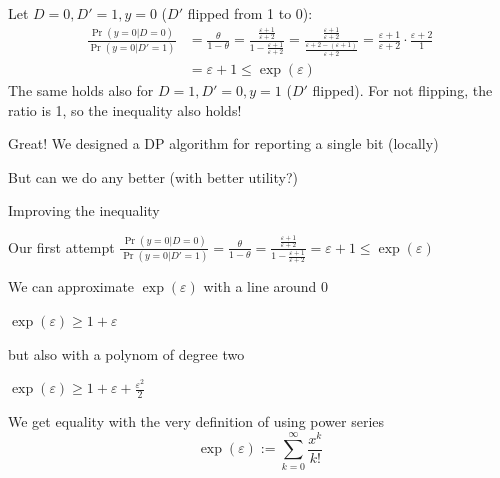 \documentclass[12pt,aspectratio=169,handout]{beamer}
\begin{document}
\begin{frame}

Let $D = 0, D' = 1, y = 0$ ($D'$ flipped from 1 to 0):
$$
\begin{aligned}
\frac{\Pr(y = 0 | D = 0)}{\Pr(y = 0 | D' = 1)} &=
\frac{\theta}{1 - \theta}
=
\frac{
\frac{\varepsilon + 1}{\varepsilon + 2}
}{
	1 - \frac{\varepsilon + 1}{\varepsilon + 2}
}
=
\frac{
\frac{\varepsilon + 1}{\varepsilon + 2}
}{
\frac{\varepsilon + 2 - (\varepsilon + 1)}{\varepsilon + 2}
}
=
\frac{\varepsilon + 1}{\varepsilon + 2}
\cdot
\frac{\varepsilon + 2}{1}
\\
&=
\varepsilon + 1
\leq \exp(\varepsilon)
\end{aligned}
$$
The same holds also for $D = 1, D' = 0, y = 1$ ($D'$ flipped). For not flipping, the ratio is 1, so the inequality also holds!

Great! We designed a DP algorithm for reporting a single bit (locally)

But can we do any better (with better utility?)

\end{frame}





\begin{frame}{Improving the inequality}

\begin{block}{Our first attempt}
$\frac{\Pr(y = 0 | D = 0)}{\Pr(y = 0 | D' = 1)} =
\frac{\theta}{1 - \theta} =
\frac{
\frac{\varepsilon + 1}{\varepsilon + 2}
}{
	1 - \frac{\varepsilon + 1}{\varepsilon + 2}
}
=
\varepsilon + 1
\leq \exp(\varepsilon)$
\end{block}

We can approximate $\exp(\varepsilon)$ with a line around 0

$\exp(\varepsilon) \geq 1 + \varepsilon$

but also with a polynom of degree two

$\exp(\varepsilon) \geq 1 + \varepsilon + \frac{\varepsilon^2}{2}$

We get equality with the very definition of using power series
$$\exp(\varepsilon) := \sum_{k = 0}^{\infty} \frac{x^k}{k!}$$
\end{frame}
\end{document}
